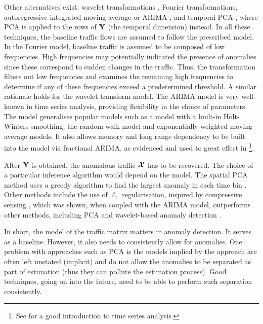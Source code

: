Other alternatives exist: wavelet transformations
\cite{Barford02Anomaly,Papagiannaki05Long}, Fourier transformations, autoregressive
integrated moving average or ARIMA \cite{Zhang05Anomography}, and
temporal PCA \cite{Zhang05Anomography}, where PCA is applied to the
rows of $\mathbf{Y}$ (the temporal dimension) instead. In all these
techniques, the baseline traffic flows are assumed to follow the
prescribed model. In the Fourier model, baseline traffic is assumed to
be composed of low frequencies. High frequencies may potentially
indicated the presence of anomalies since these correspond to sudden
changes in the traffic. Thus, the transformation filters out low
frequencies and examines the remaining high frequencies to determine
if any of these frequencies exceed a predetermined threshold. A
similar rationale holds for the wavelet transform model. The ARIMA
model \cite{Brockwell02TimeSeries} is very well-known in time series
analysis, providing flexibility in the choice of parameters. The model
generalises popular models such as a model with a built-in Holt-Winters
smoothing, the random walk model and exponentially weighted moving 
average models. It also allows memory and long range dependency 
\cite{Veitch97Wavelet} to be built into the model via fractional 
ARIMA, as evidenced and used to great effect in 
\cite{Scherrer07Memory}\footnote{See
  \cite{Brockwell02TimeSeries} for a good introduction to time series
  analysis.}.

After $\tilde {\mathbf{Y}}$ is obtained, the anomalous traffic $\tilde {\boldsymbol{\mathcal{X}}}$ has
to be recovered. The choice of a particular inference algorithm would
depend on the model. The spatial PCA method uses a greedy algorithm to
find the largest anomaly in each time bin
\cite{Lakhina04Anomaly}. Other methods include the use of $\ell_1$
regularisation, inspired by compressive sensing
\cite{CandesTaoCS06,DonohoCompressed06}, which was shown, when coupled
with the ARIMA model, outperforms other methods, including PCA and
wavelet-based anomaly detection \cite{Zhang05Anomography}.

In short, the model of the traffic matrix matters in
anomaly detection. It serves as a baseline. However, it also needs to
consistently allow for anomalies.  One problem with approaches such as
PCA is the models implied by the approach are often left unstated
(implicit) and do not allow the anomalies to be separated as part of
estimation (thus they can pollute the estimation process). Good
techniques, going on into the future, need to be able to perform such
separation consistently.


